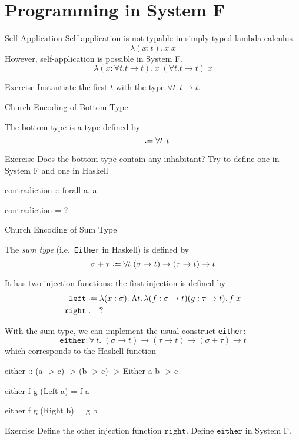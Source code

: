\section{Programming in System F}
\begin{frame}{Self Application}
Self-application is not typable in simply typed lambda calculus. 
  \[
    \lambda (x : t).\, x\; x
  \]
  However, self-application is possible in System F. 
  \[
    \lambda (x : \forall t. t\to t).\, x\;(\forall t. t\to t)\;x
  \]
  \vfill
  \begin{block}{Exercise}
    Instantiate the first $t$ with the type $\forall t.\, t \to t$.  
  \end{block}
\end{frame}
\begin{frame}[allowframebreaks]{Church Encoding of Bottom Type}
\begin{definition}
The bottom type is a type defined by
\[
  \bot \defeq \forall t.\,t
\]
\end{definition}
\begin{block}{Exercise}
  Does the bottom type contain any inhabitant? Try to define 
  one in System F and one in Haskell
  \begin{semiverbatim}
    contradiction :: forall a. a

    contradiction = ?
  \end{semiverbatim}
\end{block}
\end{frame}
\begin{frame}[allowframebreaks]{Church Encoding of Sum Type}

\begin{definition}
  The \emph{sum type} (i.e.\ \texttt{Either} in Haskell) is defined by
  \[
    \sigma + \tau \defeq \forall t. (\sigma \to t) \to (\tau \to t) \to t
  \]
\end{definition}
It has two injection functions: the first injection is defined by
\begin{align*}
  \mathtt{left} & \defeq \lambda (x : \sigma).\;\Lambda t.\,\lambda (f : \sigma\to
  t)(g : \tau\to t).\, f\;x \\
  \mathtt{right} & \defeq \;?
\end{align*}
\framebreak

With the sum type, we can implement the usual construct \texttt{either}:
\[
  \mathtt{either} : \forall\,t.\;(\sigma \to t) \to (\tau \to t)
  \to (\sigma + \tau) \to t
\]
which corresponds to the Haskell function
{\small
\begin{semiverbatim}
  either :: (a -> c) -> (b -> c) -> Either a b -> c

  either f g (Left  a) = f a 

  either f g (Right b) = g b
\end{semiverbatim}}

\begin{block}{Exercise}
  Define the other injection function $\mathtt{right}$.  Define
  $\mathtt{either}$ in System F.
\end{block}
\end{frame}

